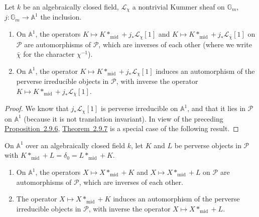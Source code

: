 Let \(k\) be an algebraically closed field, \(\mathcal{L}_\chi\) a nontrivial
Kummer sheaf on \(\mathbb{G}_m\), \(j:\mathbb{G}_m\to\mathbb{A}^1\) the
inclusion.
\begin{enumerate}[label=(\arabic*)]
\item On \(\mathbb{A}^1\), the operators
\(K\mapsto K*_{\mathrm{mid}}+j_*\mathcal{L}_\chi[1]\) and
\(K\mapsto K*_{\mathrm{mid}}+j_*\mathcal{L}_{\bar{\chi}}[1]\) on
\(\mathcal{P}\) are automorphisms of \(\mathcal{P}\), which are inverses of
each other (where we write \(\bar{\chi}\) for the character \(\chi^{-1}\)).
\item On \(\mathbb{A}^1\), the operator
\(K\mapsto K*_{\mathrm{mid}}+j_*\mathcal{L}_\chi[1]\) induces an automorphism
of the perverse irreducible objects in \(\mathcal{P}\), with inverse the
operator \(K\mapsto K*_{\mathrm{mid}}+j_*\mathcal{L}_{\bar{\chi}}[1]\).
\end{enumerate}

\begin{proof}
We know that \(j_*\mathcal{L}_\chi[1]\) is perverse irreducible on
\(\mathbb{A}^1\), and that it lies in \(\mathcal{P}\) on \(\mathbb{A}^1\)
(because it is not translation invariant). In view of the preceding \hyperref[prop:2.9.6]{Proposition~2.9.6}, \hyperref[thm:2.9.7]{Theorem~2.9.7} is a special case of the following result.
\end{proof}

On \(\mathbb{A}^1\) over an algebraically closed field \(k\), let \(K\) and
\(L\) be perverse objects in \(\mathcal{P}\) with
\(K*_{\mathrm{mid}}+L=\delta_0=L*_{\mathrm{mid}}+K\).
\begin{enumerate}[label=(\arabic*)]
\item On \(\mathbb{A}^1\), the operators \(X\mapsto X*_{\mathrm{mid}}+K\) and
\(X\mapsto X*_{\mathrm{mid}}+L\) on \(\mathcal{P}\) are automorphisms of
\(\mathcal{P}\), which are inverses of each other.
\item The operator \(X\mapsto X*_{\mathrm{mid}}+K\) induces an automorphism of
the perverse irreducible objects in \(\mathcal{P}\), with inverse the operator
\(X\mapsto X*_{\mathrm{mid}}+L\).
\end{enumerate}

